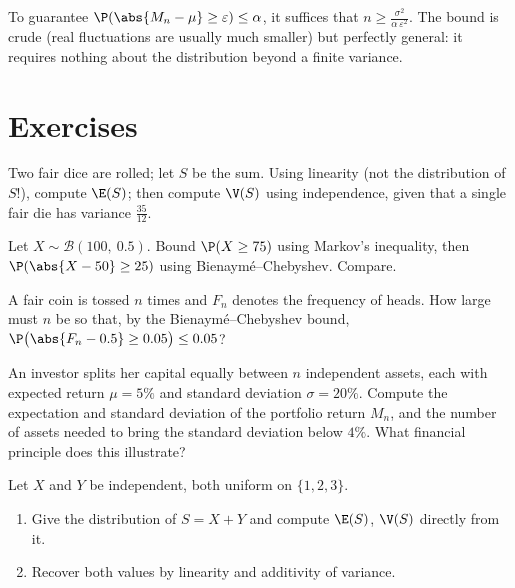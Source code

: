 \begin{method}\label{met:tle:sums:chebyshev}
To guarantee $\P(\abs{M_n - \mu} \geq \varepsilon) \leq \alpha$, it
suffices that $n \geq \frac{\sigma^2}{\alpha\,\varepsilon^2}$. The bound is
crude (real fluctuations are usually much smaller) but perfectly general:
it requires nothing about the distribution beyond a finite variance.
\end{method}

\section{Exercises}

\begin{exercise}[$\star$]\label{exo:tle:sums:1}
Two fair dice are rolled; let $S$ be the sum. Using linearity (not the
distribution of $S$!), compute $\E(S)$; then compute $\V(S)$ using
independence, given that a single fair die has variance $\frac{35}{12}$.
\end{exercise}

\begin{exercise}[$\star$]\label{exo:tle:sums:2}
Let $X \sim \mathcal B(100,\ 0.5)$. Bound
$\P(X \geq 75)$ using Markov's inequality, then
$\P(\abs{X - 50} \geq 25)$ using Bienaymé--Chebyshev. Compare.
\end{exercise}

\begin{exercise}[$\star$]\label{exo:tle:sums:3}
A fair coin is tossed $n$ times and $F_n$ denotes the frequency of heads.
How large must $n$ be so that, by the Bienaymé--Chebyshev bound,
$\P\bigl(\abs{F_n - 0.5} \geq 0.05\bigr) \leq 0.05$?
\end{exercise}

\begin{exercise}[$\star\star$]\label{exo:tle:sums:4}
An investor splits her capital equally between $n$ independent assets,
each with expected return $\mu = 5\%$ and standard deviation
$\sigma = 20\%$. Compute the expectation and standard deviation of the
portfolio return $M_n$, and the number of assets needed to bring the
standard deviation below $4\%$. What financial principle does this
illustrate?
\end{exercise}

\begin{exercise}[$\star\star$]\label{exo:tle:sums:5}
Let $X$ and $Y$ be independent, both uniform on $\{1, 2, 3\}$.
\begin{enumerate}
  \item Give the distribution of $S = X + Y$ and compute $\E(S)$, $\V(S)$
        directly from it.
  \item Recover both values by linearity and additivity of variance.
\end{enumerate}
\end{exercise}

